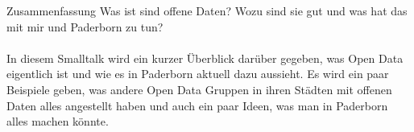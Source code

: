 \begin{frame}[t]{Zusammenfassung}
Was ist sind offene Daten? Wozu sind sie gut und was hat das mit mir und Paderborn zu tun?\\
~\\
In diesem Smalltalk wird ein kurzer Überblick darüber gegeben, was Open Data eigentlich ist und wie es in Paderborn aktuell dazu aussieht. Es wird ein paar Beispiele geben, was andere Open Data Gruppen in ihren Städten mit offenen Daten alles angestellt haben und auch ein paar Ideen, was man in Paderborn alles machen könnte.
\end{frame}